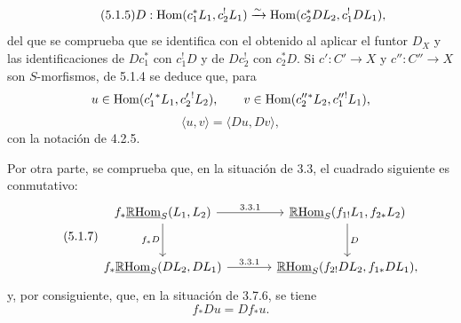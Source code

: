 \begin{equation}
\tag{5.1.5}
D:\operatorname{Hom}(c_1^*L_1,c_2^!L_1)\xrightarrow{\sim}\operatorname{Hom}(c_2^*DL_2,c_1^!DL_1),
\end{equation}
del que se comprueba que se identifica con el obtenido al aplicar el funtor $D_X$ y las identificaciones de $Dc_1^*$ con $c_1^!D$ y de $Dc_2^!$ con $c_2^*D$. Si $c':C'\to X$ y $c'':C''\to X$ son $S$-morfismos, de 5.1.4 se deduce que, para
\[
u\in\operatorname{Hom}(c_1'{}^*L_1,c_2'{}^!L_2),\qquad v\in\operatorname{Hom}(c_2''{}^*L_2,c_1''{}^!L_1),\]
\begin{equation}
\tag{5.1.6}
\langle u,v\rangle=\langle Du,Dv\rangle,
\end{equation}
con la notación de 4.2.5.

Por otra parte, se comprueba que, en la situación de 3.3, el cuadrado siguiente es conmutativo:
\begin{equation}
\tag{5.1.7}
\begin{tikzcd}[column sep=large,row sep=large]
f_*\uRHom_S(L_1,L_2) \arrow[r,"3.3.1"] \arrow[d,"f_*D"']
& \uRHom_S(f_{1!}L_1,f_{2*}L_2) \arrow[d,"D"] \\
f_*\uRHom_S(DL_2,DL_1) \arrow[r,"3.3.1"]
& \uRHom_S(f_{2!}DL_2,f_{1*}DL_1),
\end{tikzcd}
\end{equation}
y, por consiguiente, que, en la situación de 3.7.6, se tiene
\begin{equation}
\tag{5.1.8}
f_*Du=Df_*u.
\end{equation}
